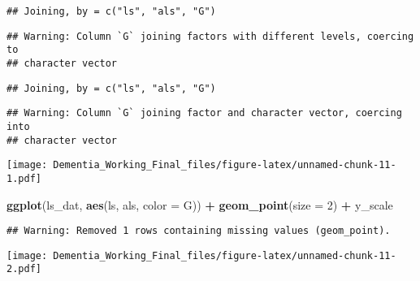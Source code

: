 \documentclass[]{article}
\newenvironment{Shaded}{\begin{snugshade}}{\end{snugshade}}
\newcommand{\DataTypeTok}[1]{\textcolor[rgb]{0.13,0.29,0.53}{#1}}
\newcommand{\DecValTok}[1]{\textcolor[rgb]{0.00,0.00,0.81}{#1}}
\newcommand{\KeywordTok}[1]{\textcolor[rgb]{0.13,0.29,0.53}{\textbf{#1}}}
\newcommand{\NormalTok}[1]{#1}
\newcommand{\OperatorTok}[1]{\textcolor[rgb]{0.81,0.36,0.00}{\textbf{#1}}}
\newcommand{\StringTok}[1]{\textcolor[rgb]{0.31,0.60,0.02}{#1}}
\begin{document}
\begin{verbatim}
## Joining, by = c("ls", "als", "G")
\end{verbatim}

\begin{verbatim}
## Warning: Column `G` joining factors with different levels, coercing to
## character vector
\end{verbatim}

\begin{verbatim}
## Joining, by = c("ls", "als", "G")
\end{verbatim}

\begin{verbatim}
## Warning: Column `G` joining factor and character vector, coercing into
## character vector
\end{verbatim}

\begin{Shaded}
\end{Shaded}

\texttt{[image: Dementia\_Working\_Final\_files/figure-latex/unnamed-chunk-11-1.pdf]}

\begin{Shaded}
\begin{Highlighting}[]
\KeywordTok{ggplot}\NormalTok{(ls_dat, }\KeywordTok{aes}\NormalTok{(ls, als, }\DataTypeTok{color =}\NormalTok{ G)) }\OperatorTok{+}\StringTok{ }\KeywordTok{geom_point}\NormalTok{(}\DataTypeTok{size =} \DecValTok{2}\NormalTok{) }\OperatorTok{+}\StringTok{ }\NormalTok{y_scale}
\end{Highlighting}
\end{Shaded}

\begin{verbatim}
## Warning: Removed 1 rows containing missing values (geom_point).
\end{verbatim}

\texttt{[image: Dementia\_Working\_Final\_files/figure-latex/unnamed-chunk-11-2.pdf]}

\begin{Shaded}
\end{Shaded}
\end{document}
